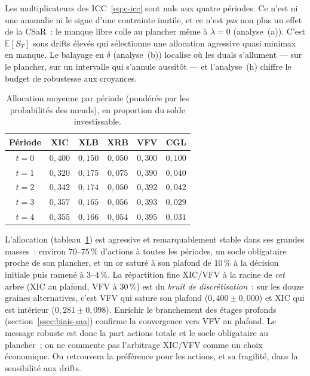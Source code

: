 \documentclass[11pt,letterpaper]{article}
\newcommand{\E}{\mathbb{E}}
\theoremstyle{definition}
\begin{document}
Les multiplicateurs des ICC~\eqref{eq:c-icc} sont nuls aux quatre périodes. Ce
n'est ni une anomalie ni le signe d'une contrainte inutile, et ce n'est
\emph{pas} non plus un effet de la CSaR~: le manque libre colle au plancher
même à $\lambda = 0$ (analyse~(a)). C'est $\E[S_T]$ sous drifts élevés qui
sélectionne une allocation agressive quasi minimax en manque. Le balayage
en $\delta$ (analyse~(b)) localise où les duals s'allument --- sur le plancher,
sur un intervalle qui s'annule aussitôt --- et l'analyse~(h) chiffre le budget de
robustesse aux croyances.

\begin{table}[htbp]
\centering
\caption{Allocation moyenne par période (pondérée par les probabilités des
n\oe uds), en proportion du solde investissable.}
\label{tab:alloc}
\begin{tabular}{cccccc}
\toprule
Période & XIC & XLB & XRB & VFV & CGL \\
\midrule
$t=0$ & $0{,}400$ & $0{,}150$ & $0{,}050$ & $0{,}300$ & $0{,}100$ \\
$t=1$ & $0{,}320$ & $0{,}175$ & $0{,}075$ & $0{,}390$ & $0{,}040$ \\
$t=2$ & $0{,}342$ & $0{,}174$ & $0{,}050$ & $0{,}392$ & $0{,}042$ \\
$t=3$ & $0{,}357$ & $0{,}165$ & $0{,}056$ & $0{,}393$ & $0{,}029$ \\
$t=4$ & $0{,}355$ & $0{,}166$ & $0{,}054$ & $0{,}395$ & $0{,}031$ \\
\bottomrule
\end{tabular}
\end{table}

L'allocation (tableau~\ref{tab:alloc}) est agressive et remarquablement
stable dans ses grandes masses~: environ $70$--$75\,\%$ d'actions à toutes les
périodes, un socle obligataire proche de son plancher, et un or saturé à son
plafond de $10\,\%$ à la décision initiale puis ramené à $3$--$4\,\%$. La
répartition fine XIC/VFV à la racine de \emph{cet} arbre (XIC au plafond, VFV à
$30\,\%$) est du \emph{bruit de discrétisation}~: sur les douze graines
alternatives, c'est VFV qui sature son plafond ($0{,}400 \pm 0{,}000$) et XIC
qui est intérieur ($0{,}281 \pm 0{,}098$). Enrichir le branchement des étages
profonds (section~\ref{ssec:biais-saa}) confirme la convergence vers VFV au
plafond. Le message robuste est donc la part actions totale et le socle
obligataire au plancher~; on ne commente pas l'arbitrage XIC/VFV comme un
choix économique. On retrouvera la préférence pour les actions, et sa
fragilité, dans la sensibilité aux drifts.
\end{document}
